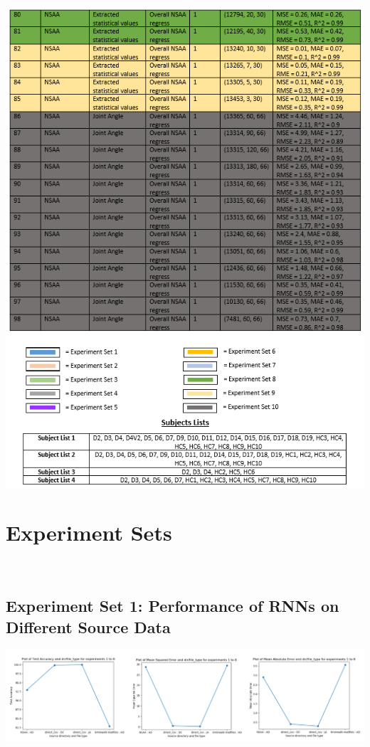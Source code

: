 \documentclass[12pt,twoside]{report}
\begin{document}
\begin{center}
\includegraphics[scale=1]{project_figures/fig10_6}
\end{center}






\chapter{Experiment Sets\\~\\}


\section{Experiment Set 1: Performance of RNNs on Different Source Data}

\begin{center}
\includegraphics[scale=0.4]{project_figures/fig10_7}
\end{center}
\end{document}

